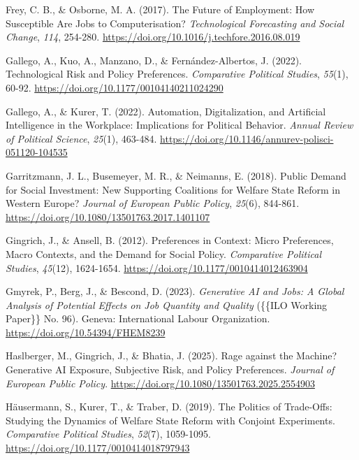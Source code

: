 \documentclass[
  spanish,
  12pt,
]{article}
\newlength{\cslhangindent}
\newenvironment{CSLReferences}[2] %
 {\begin{list}{}{%
  \setlength{\itemindent}{0pt}
  \setlength{\leftmargin}{0pt}
  \setlength{\parsep}{0pt}
  \ifodd #1
   \setlength{\leftmargin}{\cslhangindent}
   \setlength{\itemindent}{-1\cslhangindent}
  \fi
  \setlength{\itemsep}{#2\baselineskip}}}
 {\end{list}}
\begin{document}
\begin{CSLReferences}{1}{0}
Frey, C. B., \& Osborne, M. A. (2017). The Future of Employment: {How}
Susceptible Are Jobs to Computerisation? \emph{Technological Forecasting
and Social Change}, \emph{114}, 254-280.
\url{https://doi.org/10.1016/j.techfore.2016.08.019}

Gallego, A., Kuo, A., Manzano, D., \& Fernández-Albertos, J. (2022).
Technological Risk and Policy Preferences. \emph{Comparative Political
Studies}, \emph{55}(1), 60-92.
\url{https://doi.org/10.1177/00104140211024290}

Gallego, A., \& Kurer, T. (2022). Automation, {Digitalization}, and
{Artificial Intelligence} in the {Workplace}: {Implications} for
{Political Behavior}. \emph{Annual Review of Political Science},
\emph{25}(1), 463-484.
\url{https://doi.org/10.1146/annurev-polisci-051120-104535}

Garritzmann, J. L., Busemeyer, M. R., \& Neimanns, E. (2018). Public
Demand for Social Investment: {New} Supporting Coalitions for Welfare
State Reform in {Western Europe}? \emph{Journal of European Public
Policy}, \emph{25}(6), 844-861.
\url{https://doi.org/10.1080/13501763.2017.1401107}

Gingrich, J., \& Ansell, B. (2012). Preferences in Context: {Micro}
Preferences, Macro Contexts, and the Demand for Social Policy.
\emph{Comparative Political Studies}, \emph{45}(12), 1624-1654.
\url{https://doi.org/10.1177/0010414012463904}

Gmyrek, P., Berg, J., \& Bescond, D. (2023). \emph{Generative {AI} and
Jobs: A Global Analysis of Potential Effects on Job Quantity and
Quality} (\{\{ILO Working Paper\}\} No. 96). Geneva: International
Labour Organization. \url{https://doi.org/10.54394/FHEM8239}

Haslberger, M., Gingrich, J., \& Bhatia, J. (2025). Rage against the
Machine? {Generative AI} Exposure, Subjective Risk, and Policy
Preferences. \emph{Journal of European Public Policy}.
\url{https://doi.org/10.1080/13501763.2025.2554903}

Häusermann, S., Kurer, T., \& Traber, D. (2019). The Politics of
Trade-Offs: {Studying} the Dynamics of Welfare State Reform with
Conjoint Experiments. \emph{Comparative Political Studies},
\emph{52}(7), 1059-1095. \url{https://doi.org/10.1177/0010414018797943}


\end{CSLReferences}
\end{document}
